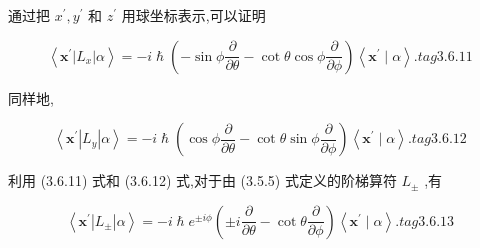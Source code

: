 通过把 ${x}^{\prime },{y}^{\prime }$ 和 ${z}^{\prime }$ 用球坐标表示,可以证明

$$
\left\langle {{\mathbf{x}}^{\prime }\left| {L}_{x}\right| \alpha }\right\rangle = - i\hslash \left( {-\sin \phi \frac{\partial }{\partial \theta } - \cot \theta \cos \phi \frac{\partial }{\partial \phi }}\right) \left\langle {{\mathbf{x}}^{\prime } \mid \alpha }\right\rangle . tag{3. 6.11}
$$

同样地,

$$
\left\langle {{\mathbf{x}}^{\prime }\left| {L}_{y}\right| \alpha }\right\rangle = - i\hslash \left( {\cos \phi \frac{\partial }{\partial \theta } - \cot \theta \sin \phi \frac{\partial }{\partial \phi }}\right) \left\langle {{\mathbf{x}}^{\prime } \mid \alpha }\right\rangle . tag{3. 6.12}
$$

利用 (3.6.11) 式和 (3.6.12) 式,对于由 (3.5.5) 式定义的阶梯算符 ${L}_{ \pm }$ ,有

$$
\left\langle {{\mathbf{x}}^{\prime }\left| {L}_{ \pm }\right| \alpha }\right\rangle = - i\hslash {e}^{\pm {i\phi }}\left( {\pm i\frac{\partial }{\partial \theta } - \cot \theta \frac{\partial }{\partial \phi }}\right) \left\langle {{\mathbf{x}}^{\prime } \mid \alpha }\right\rangle . tag{3. 6.13}
$$

